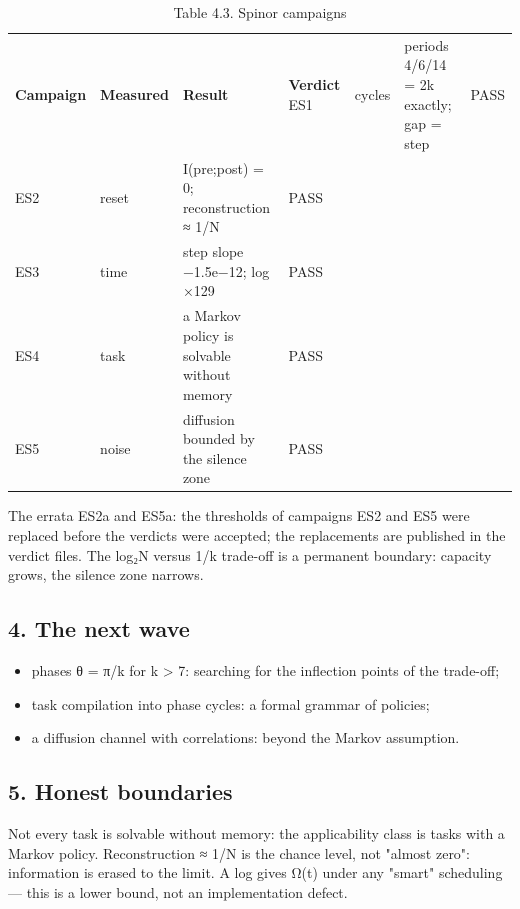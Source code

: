 \documentclass[11pt,a4paper]{article}
\begin{document}
\begin{table}[htbp]\centering\small
\caption{Table 4.3. Spinor campaigns}
\begin{tabular}{p{} p{} p{} p{}}
\toprule
\textbf{Campaign} & \textbf{Measured} & \textbf{Result} & \textbf{Verdict}
\midrule
ES1 & cycles & periods 4/6/14 = 2k exactly; gap = step & PASS \\
ES2 & reset & I(pre;post) = 0; reconstruction ≈ 1/N & PASS \\
ES3 & time & step slope −1.5e−12; log ×129 & PASS \\
ES4 & task & a Markov policy is solvable without memory & PASS \\
ES5 & noise & diffusion bounded by the silence zone & PASS \\
\bottomrule
\end{tabular}
\end{table}

The errata ES2a and ES5a: the thresholds of campaigns ES2 and ES5 were replaced before the verdicts were accepted; the replacements are published in the verdict files. The log₂N versus 1/k trade-off is a permanent boundary: capacity grows, the silence zone narrows.

\subsection{4. The next wave}

\begin{itemize}
  \item phases θ = π/k for k > 7: searching for the inflection points of the trade-off;
  \item task compilation into phase cycles: a formal grammar of policies;
  \item a diffusion channel with correlations: beyond the Markov assumption.
\end{itemize}

\subsection{5. Honest boundaries}

Not every task is solvable without memory: the applicability class is tasks with a Markov policy. Reconstruction ≈ 1/N is the chance level, not "almost zero": information is erased to the limit. A log gives Ω(t) under any "smart" scheduling — this is a lower bound, not an implementation defect.
\end{document}

